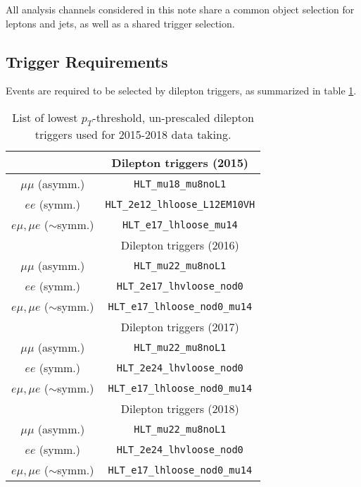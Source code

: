 
All analysis channels considered in this note share a common object selection for leptons and jets, as well as a shared trigger selection. 

\subsection{Trigger Requirements}

Events are required to be selected by dilepton triggers, as summarized in table \ref{tbl:trigger}.

\begin{table}[h!]
 \begin{center}
   \begin{tabular}{cc}
     \toprule
                  & Dilepton triggers (2015) \\
     \midrule
      $\mu\mu$ (asymm.)          & \verb!HLT_mu18_mu8noL1! \\
      $ee$ (symm.)               & \verb!HLT_2e12_lhloose_L12EM10VH! \\
      $e\mu,\mu e$ ($\sim$symm.) & \verb!HLT_e17_lhloose_mu14! \\
     \bottomrule
                       & Dilepton triggers (2016) \\
     \midrule
      $\mu\mu$ (asymm.)                   & \verb!HLT_mu22_mu8noL1! \\
      $ee$ (symm.)                        & \verb!HLT_2e17_lhvloose_nod0! \\
      $e\mu,\mu e$ ($\sim$symm.)          & \verb!HLT_e17_lhloose_nod0_mu14! \\
     \bottomrule

                  & Dilepton triggers (2017) \\
     \midrule
      $\mu\mu$ (asymm.)                   & \verb!HLT_mu22_mu8noL1! \\
      $ee$ (symm.)                        & \verb!HLT_2e24_lhvloose_nod0! \\
      $e\mu,\mu e$ ($\sim$symm.)          & \verb!HLT_e17_lhloose_nod0_mu14! \\
     \bottomrule
                  & Dilepton triggers (2018) \\
     \midrule
      $\mu\mu$ (asymm.)                   & \verb!HLT_mu22_mu8noL1! \\
      $ee$ (symm.)                        & \verb!HLT_2e24_lhvloose_nod0! \\
      $e\mu,\mu e$ ($\sim$symm.)          & \verb!HLT_e17_lhloose_nod0_mu14! \\
      \bottomrule
   \end{tabular}
   \caption{\label{tbl:trigger} List of lowest $p_{T}$-threshold, un-prescaled dilepton triggers used for 2015-2018 data taking.}
 \end{center}
\end{table}


